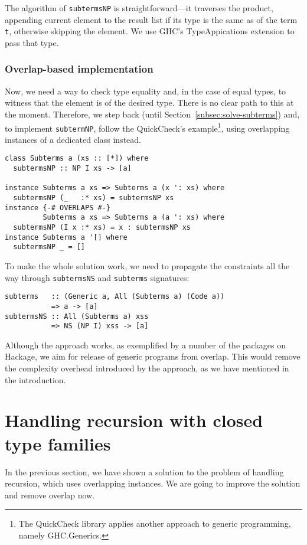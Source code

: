 \documentclass[runningheads]{llncs}
\newcommand{\K}[1]{\lstinline{#1}}
\begin{document}
The algorithm of \K{subtermsNP} is straightforward---it traverses the product, appending current element to the result list if its type is the same as of the term \K{t}, otherwise skipping the element. We use GHC's \textsf{TypeAppications} extension to pass that type.

\subsubsection{Overlap-based implementation}

Now, we need a way to check type equality and, in the case of equal types, to witness that the element is of the desired type. There is no clear path to this at the moment. Therefore, we step back (until Section~\ref{subsec:solve-subterms}) and, to implement \K{subtermNP}, follow the \textsf{QuickCheck}'s example\footnote{The \textsf{QuickCheck} library applies another approach to generic programming, namely \textsf{GHC.Generics}.}, using overlapping instances of a dedicated class instead.
\begin{lstlisting}
class Subterms a (xs :: [*]) where
  subtermsNP :: NP I xs -> [a]

instance Subterms a xs => Subterms a (x ': xs) where
  subtermsNP (_   :* xs) = subtermsNP xs
instance {-# OVERLAPS #-}
         Subterms a xs => Subterms a (a ': xs) where
  subtermsNP (I x :* xs) = x : subtermsNP xs
instance Subterms a '[] where
  subtermsNP _ = []
\end{lstlisting}

To make the whole solution work, we need to propagate the constraints all the way through \K{subtermsNS} and \K{subterms} signatures:
\begin{lstlisting}
subterms   :: (Generic a, All (Subterms a) (Code a))
           => a -> [a]
subtermsNS :: All (Subterms a) xss
           => NS (NP I) xss -> [a]
\end{lstlisting}

Although the approach works, as exemplified by a number of the packages on Hackage, we aim for release of generic programs from overlap. This would remove the complexity overhead introduced by the approach, as we have mentioned in the introduction.


\section{Handling recursion with closed type families}
\label{sec:handling-recursion}


In the previous section, we have shown a solution to the problem of handling recursion, which uses overlapping instances. We are going to improve the solution and remove overlap now.
\end{document}
